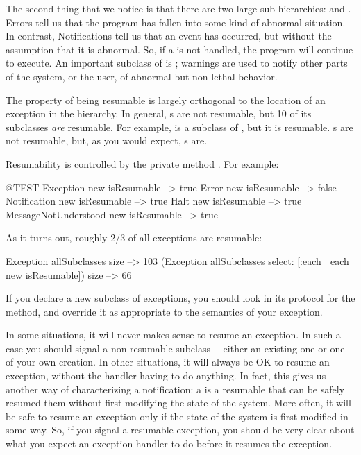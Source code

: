 \documentclass[a4paper,10pt,twoside]{book}
\begin{document}
The second thing that we notice is that there are two large sub-hierarchies:  and . 
Errors tell us that the program has fallen into some kind of abnormal situation. 
In contrast, Notifications tell us that an event has occurred, but without the assumption that it is abnormal. 
So, if a  is not handled, the program will continue to execute. 
An important subclass of  is ;  warnings are used to notify other parts of the system, or the user, of abnormal but non-lethal behavior.
%

The property of being resumable is largely orthogonal to the location of an exception in the hierarchy.   In general, s are not resumable, but 10 of its subclasses \emph{are} resumable.  For example,  is a subclass of , but it is resumable.  s are not resumable, but, as you would expect, s are. 

Resumability is controlled by the private  method . 
For example:
\begin{code}{@TEST}
Exception new isResumable --> true
Error new isResumable --> false
Notification new isResumable --> true
Halt new isResumable --> true
MessageNotUnderstood new isResumable --> true
\end{code}

As it turns out, roughly 2/3 of all exceptions are resumable:
\begin{code}{}
Exception allSubclasses size --> 103
(Exception allSubclasses select: [:each | each new isResumable]) size --> 66
\end{code}
If you declare a new subclass of exceptions, you should look in its protocol for the  method, and override it as appropriate to the semantics of your exception.

In some situations, it will never makes sense to resume an exception.
In such a case you should signal a non-resumable subclass\,---\,either an existing one or one of your own creation.
In other situations, it will always be OK to resume an exception, without the handler having to do anything.
In fact, this gives us another way of characterizing a notification:
a  is a resumable  that can be safely resumed them without first modifying the state of the system.
More often, it will be safe to resume an exception only if the state of the system is first modified in some way.
So, if you signal a resumable exception, you should be very clear about what you expect an exception handler to do before it resumes the exception.
\end{document}
